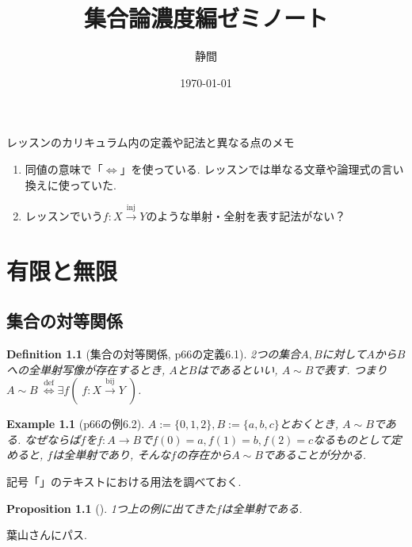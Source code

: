 \documentclass[a4j,dvipdfmx,10pt]{ujreport}
\title{集合論濃度編ゼミノート}
\author{静間}
\date{\today}
\makeatletter
\theoremstyle{mystyle}
\newtheorem{my-proposition}[my-theorem]{Proposition}
\newtheorem{my-definition}[my-theorem]{Definition}
\newtheorem{my-example}[my-theorem]{Example}
\newcommand{\thmsymbol}{$\blacksquare$}
\newenvironment{proposition}[1][]{
  \begin{my-proposition}[#1]%
  \renewcommand{\qedsymbol}{\thmsymbol}\pushQED{\qed}}%
  {\popQED\end{my-proposition}
}
\newenvironment{definition}[1][]{
  \begin{my-definition}[#1]%
  \renewcommand{\qedsymbol}{\thmsymbol}\pushQED{\qed}}%
  {\popQED\end{my-definition}
}
\newenvironment{example}[1][]{
  \begin{my-example}[#1]%
  \renewcommand{\qedsymbol}{\thmsymbol}\pushQED{\qed}}%
  {\popQED\end{my-example}
}
\renewcommand{\proofname}{Proof}
\renewenvironment{proof}[1][\proofname]{\par
  \pushQED{\qed}%
  \normalfont \topsep6\p@\@plus6\p@\relax
  \trivlist
  \item[\hskip\labelsep
        \itshape
    {\bf\underline{#1}\@addpunct{\ }}]\ignorespaces
}{%
  \popQED\endtrivlist\@endpefalse
}
\newcommand{\defarr}{\ \mbox{$\stackrel{\text{def}}{\Longleftrightarrow}$}}
\newcommand{\tempdefeq}{:=}
\newcommand{\map}[3]{#1\colon #2 \to #3}
\newcommand{\InjectionMap}[3]{
  #1\colon #2 \xrightarrow{\text{inj}} #3
}
\newcommand{\BijectionMap}[3]{
  #1\colon #2 \xrightarrow{\text{bij}} #3
}
\makeatother
\begin{document}
\maketitle

レッスンのカリキュラム内の定義や記法と異なる点のメモ
\begin{enumerate}
  \item 
    同値の意味で「$\Leftrightarrow$」を使っている.
    レッスンでは単なる文章や論理式の言い換えに使っていた.
  \item レッスンでいう$\InjectionMap{f}{X}{Y}$のような単射・全射を表す記法がない？
\end{enumerate}

\newpage

\setcounter{chapter}{5}
\chapter{有限と無限}
\label{chapter:有限と無限}

\setcounter{section}{0}
\section{集合の対等関係}
\label{section:集合の対等関係}

\begin{definition}[集合の対等関係, p66の定義6.1]
  \label{definition:集合の対等関係}
  2つの集合$A,B$に対して$A$から$B$への全単射写像が存在するとき,
  $A$と$B$はであるといい,
  $A\sim B$で表す.
  つまり$A\sim B \defarr \exists f( \; \BijectionMap{f}{X}{Y} \; )$.
\end{definition}

\begin{example}[p66の例6.2]
  $A\tempdefeq \{ 0,1,2 \},B\tempdefeq \{ a,b,c \}$とおくとき,
  $A\sim B$である.
  なぜならば$f$を$\map{f}{A}{B}$で$f(0)=a,f(1)=b,f(2)=c$なるものとして定めると,
  $f$は全単射であり,
  そんな$f$の存在から$A\sim B$であることが分かる.
\end{example}

\begin{boxnote}
  記号「」のテキストにおける用法を調べておく.
\end{boxnote}

\begin{proposition}
  1つ上の例に出てきた$f$は全単射である.
\end{proposition}

\begin{proof}
  葉山さんにパス.
\end{proof}
\end{document}
